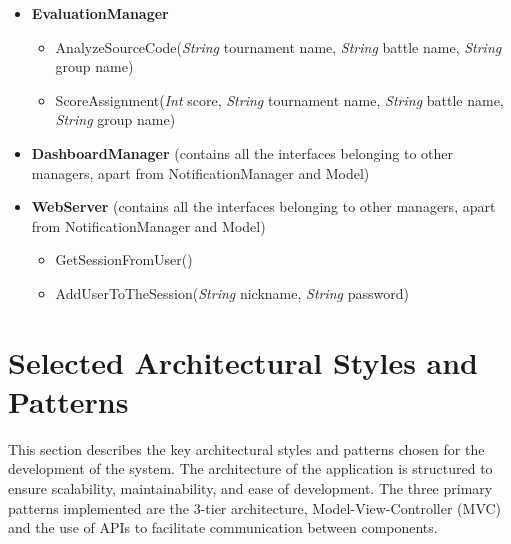 \begin{itemize}
    \item \textbf{\textbf{EvaluationManager}}

\begin{itemize}
        \item AnalyzeSourceCode(\textit{String} tournament name, \textit{String} battle name, \textit{String} group name)
        \item ScoreAssignment(\textit{Int}  score, \textit{String} tournament name, \textit{String} battle name, \textit{String} group name)
\end{itemize}

    \item \textbf{\textbf{DashboardManager}} (contains all the interfaces belonging to other managers, apart from NotificationManager and Model)

    \item \textbf{\textbf{WebServer}} (contains all the interfaces belonging to other managers, apart from NotificationManager and Model)
    \begin{itemize}
        \item GetSessionFromUser()
        \item AddUserToTheSession(\textit{String} nickname, \textit{String} password)
\end{itemize}

\end{itemize}


\section{Selected Architectural Styles and Patterns}
\label{sec:selected_Srchitectural_styles_patterns}%
This section describes the key architectural styles and patterns chosen for the development of the system. The architecture of the application is structured to ensure scalability, maintainability, and ease of development. The three primary patterns implemented are the 3-tier architecture, Model-View-Controller (MVC) and the use of APIs to facilitate communication between components.

